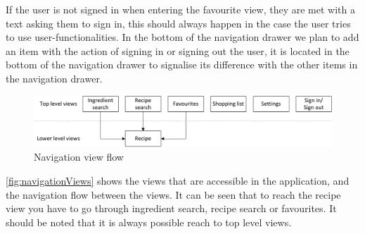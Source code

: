 If the user is not signed in when entering the favourite view, they are met with a text asking them to sign in, this should always happen in the case the user tries to use user-functionalities. 
In the bottom of the navigation drawer we plan to add an item with the action of signing in or signing out the user, it is located in the bottom of the navigation drawer to signalise its difference with the other items in the navigation drawer.
\begin{figure}[H]
\centering
\includegraphics[width=1.0\linewidth]{img/navigation.pdf}
\caption{Navigation view flow}
\label{fig:navigationViews}
\end{figure}
\autoref{fig:navigationViews} shows the views that are accessible in the application, and the navigation flow between the views. 
It can be seen that to reach the recipe view you have to go through ingredient search, recipe search or favourites. It should be noted that it is always possible reach to top level views.

